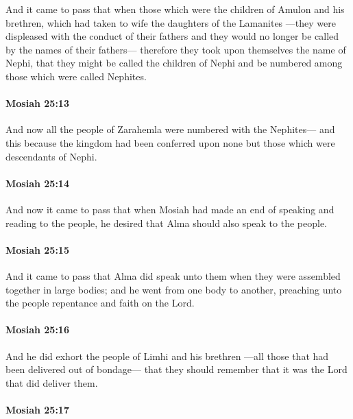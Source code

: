 			And it came to pass that
			when those which were the children of Amulon and his brethren,
			which had taken to wife the daughters of the Lamanites
			---they were displeased with the conduct of their fathers
			and they would no longer be called by the names of their fathers---
			therefore they took upon themselves the name of Nephi,
			that they might be called the children of Nephi
			and be numbered among those which were called Nephites.

		\paragraph{Mosiah 25:13} %
			\label{MOSIAH-25-13}

			And now all the people of Zarahemla were numbered with the Nephites---
			and this because the kingdom had been conferred upon none
			but those which were descendants of Nephi.

		\paragraph{Mosiah 25:14} %
			\label{MOSIAH-25-14}

			And now it came to pass that
			when Mosiah had made an end of speaking and reading to the people,
			he desired that Alma should also speak to the people.

		\paragraph{Mosiah 25:15} %
			\label{MOSIAH-25-15}

			And it came to pass that Alma did speak unto them
			when they were assembled together in large bodies;
			and he went from one body to another,
			preaching unto the people repentance and faith on the Lord.

		\paragraph{Mosiah 25:16} %
			\label{MOSIAH-25-16}

			And he did exhort the people of Limhi and his brethren
			---all those that had been delivered out of bondage---
			that they should remember that it was the Lord that did deliver them.

		\paragraph{Mosiah 25:17} %
			\label{MOSIAH-25-17}

